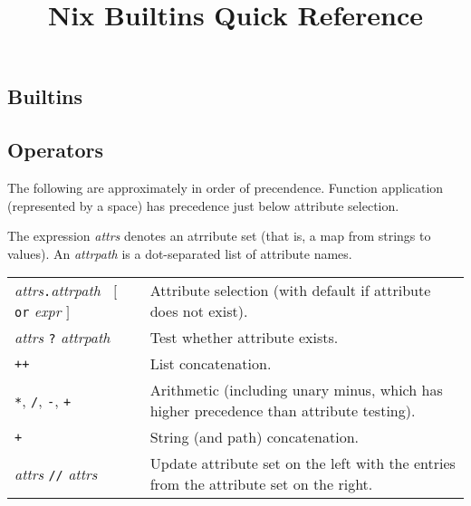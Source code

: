 \documentclass[9pt, a4paper, landscape]{extarticle}
\title{Nix Builtins Quick Reference}
\date{\vskip-10ex August 2024}
\newcommand{\cmd}[1]{\texttt{#1}}
\begin{document}
\begin{multicols*}{3}\raggedcolumns%
\maketitle

\section*{Builtins}


\subsection*{Operators}

The following are approximately in order of precendence. Function
application (represented by a space) has precedence just below
attribute selection.

The expression \emph{attrs} denotes an atrribute set (that is, a map
from strings to values). An \emph{attrpath} is a dot-separated list of
attribute names.

\begin{tabularx}{\columnwidth}{@{}l>{\raggedright\arraybackslash}X@{}}

  \parbox[t]{8em}{\emph{attrs}\texttt{.}\emph{attrpath} \\
    ${}\;\;[$ \texttt{or} \emph{expr} $]$}
  & Attribute selection (with default if attribute does not exist). \\

  \emph{attrs} \texttt{?} \emph{attrpath} & Test whether attribute
  exists. \\

  \cmd{++} & List concatenation. \\
  
  \cmd{*}, \cmd{/}, \cmd{-}, \cmd{+} & Arithmetic (including unary
  minus, which has higher precedence than attribute testing). \\
  
  \cmd{+} & String (and path) concatenation. \\

  \emph{attrs} \cmd{//} \emph{attrs} & Update attribute set on the
  left with the entries from the attribute set on the right. \\
  

\end{tabularx}
\end{multicols*}
\end{document}
